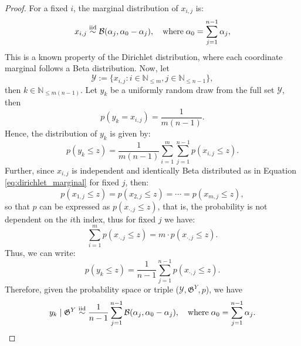 \begin{proof}
    For a fixed $i$, the marginal distribution of $x_{i,j}$ is:
    \begin{equation}\label{eq:dirichlet_marginal}
        x_{i,j}\overset{\textnormal{iid}}{\sim}\mathcal{B}(\alpha_j,\alpha_0-\alpha_j),\quad\text{where}\;\alpha_0=\sum_{j=1}^{n-1}\alpha_j,
    \end{equation}
    This is a known property of the Dirichlet distribution, where each coordinate marginal follows a Beta distribution. Now, let 
    \begin{equation}
        \mathcal{Y}:=\{x_{i,j}:i\in\mathbb{N}_{\leq m}, j\in\mathbb{N}_{\leq n-1}\},
    \end{equation}
    then $k\in\mathbb{N}_{\leq m(n-1)}$. Let $y_k$ be a uniformly random draw from the full set $\mathcal{Y}$, then 
    \begin{equation}
        p(y_k=x_{i,j})=\frac{1}{m(n-1)}.
    \end{equation}
    Hence, the distribution of $y_k$ is given by:
    \begin{equation}
        p(y_k\leq z)=\frac{1}{m(n-1)}\sum_{i=1}^m\sum_{j=1}^{n-1}p(x_{i,j}\leq z).
    \end{equation}
    Further, since $x_{i,j}$ is independent and identically Beta distributed as in Equation \ref{eq:dirichlet_marginal} for fixed $j$, then:
    \begin{equation}
        p(x_{1,j}\leq z)=p(x_{2,j}\leq z)=\cdots=p(x_{m,j}\leq z),
    \end{equation}
    so that $p$ can be expressed as $p(x_{\cdot,j}\leq z)$, that is, the probability is not dependent on the $i$th index, thus for fixed $j$ we have:
    \begin{equation}
        \sum_{i=1}^m p(x_{\cdot,j}\leq z)=m\cdot p(x_{\cdot,j}\leq z).
    \end{equation}
    Thus, we can write:
    \begin{equation}
        p(y_k\leq z)=\frac{1}{n-1}\sum_{j=1}^{n-1}p(x_{\cdot,j}\leq z).
    \end{equation}
    Therefore, given the probability space or triple ($\mathscr{Y},\mathfrak{G}^{Y},p$), we have
    \begin{equation}
        y_k\mid\mathfrak{G}^{Y}\overset{\textnormal{iid}}{\sim}\frac{1}{n-1}\sum_{j=1}^{n-1}\mathcal{B}(\alpha_j,\alpha_0-\alpha_j),\quad\text{where}\;\alpha_0=\sum_{j=1}^{n-1}\alpha_j.
    \end{equation}
\end{proof}
